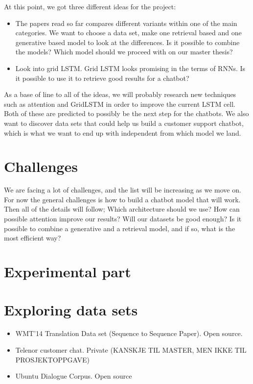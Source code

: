 \documentclass{article} %
\begin{document}
At this point, we got three different ideas for the project:

\begin{itemize}

\item The papers read so far compares different variants within one of the main categories. We want to choose a data set, make one retrieval based and one generative based model to look at the differences. Is it possible to combine the models? Which model should we proceed with on our master thesis? 

\item Look into grid LSTM. Grid LSTM looks promising in the terms of RNNs. Is it possible to use it to retrieve good results for a chatbot?

\end{itemize}

As a base of line to all of the ideas, we will probably research new techniques such as attention and GridLSTM in order to improve the current LSTM cell. Both of these are predicted to possibly be the next step for the chatbots. We also want to discover data sets that could help us build a customer support chatbot, which is what we want to end up with independent from which model we land.



\section{Challenges}

We are facing a lot of challenges, and the list will be increasing as we move on. For now the general challenges is how to build a chatbot model that will work. Then all of the details will follow; Which architecture should we use? How can possible attention improve our results? Will our datasets be good enough? Is it possible to combine a generative and a retrieval model, and if so, what is the most efficient way?

\section{Experimental part}
\section{Exploring data sets}

\begin{itemize}
    \item WMT'14 Translation Data set (Sequence to Sequence Paper). Open source.
    \item Telenor customer chat. Private (KANSKJE TIL MASTER, MEN IKKE TIL PROSJEKTOPPGAVE)
    \item Ubuntu Dialogue Corpus. Open source
\end{itemize}
\end{document}
